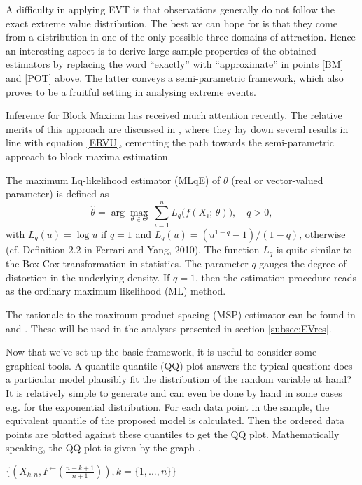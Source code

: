 \documentclass[a4paper]{article}
\newcommand{\sumab}[2]{\ensuremath{\sum\limits_{#1}^{#2}}}
\newcommand{\argmax}[1]{\ensuremath{\displaystyle {\arg\max_{#1}}}}
\begin{document}
A difficulty in applying EVT is that observations generally do not follow the exact extreme value distribution. The best we can hope for is that they come from a distribution in one of the only possible three domains of attraction. Hence an interesting aspect is to derive large sample properties of the obtained estimators by replacing the word ``exactly'' with ``approximate'' in points \ref{BM} and \ref{POT} above. The latter conveys a semi-parametric framework, which also proves to be a  fruitful setting in analysing extreme events. 

Inference for Block Maxima has received much attention recently. The relative merits of this approach are discussed in \cite{FdeH:15}, where they lay down several results in line with equation \ref{ERVU}, cementing the path towards the semi-parametric approach to block maxima estimation.

The maximum Lq-likelihood estimator (MLqE) of $\theta$ (real or vector-valued parameter) is defined as
\begin{equation*}
	\hat{\theta}= \argmax{\theta \in \Theta} \, \sumab{i=1}{n} L_q\bigl( f(X_i; \, \theta)\bigr), \quad q>0,
\end{equation*}
with $L_q(u)= \log u$ if $q=1$ and $L_q(u)= (u^{1-q}- 1)/(1-q)$, otherwise (cf. Definition 2.2 in Ferrari and Yang, 2010). The function $L_q$ is quite similar to the Box-Cox transformation in statistics. The parameter $q$ gauges the degree of distortion in the underlying density. If $q=1$, then the estimation procedure reads as the ordinary maximum likelihood (ML) method.

The rationale to the maximum product spacing (MSP) estimator can be found in \cite{ChengAmin:79} and \cite{Ranneby:84}. These will be used in the analyses presented in section \ref{subsec:EVres}.

Now that we've set up the basic framework, it is useful to consider some graphical tools. A quantile-quantile (QQ) plot answers the typical question: does a particular model plausibly fit the distribution of the random variable at hand? It is relatively simple to generate and can even be done by hand in some cases e.g. for the exponential distribution. For each data point in the sample, the equivalent quantile of the proposed model is calculated. Then the ordered data points are plotted against these quantiles to get the QQ plot. Mathematically speaking, the QQ plot is given by the graph \cite[ch.~6]{embrechts}. \newline

\centerline{$\{(X_{k,n},F^{\leftarrow}(\frac{n-k+1}{n+1})), k = \{1,...,n\}\}$}
\end{document}
